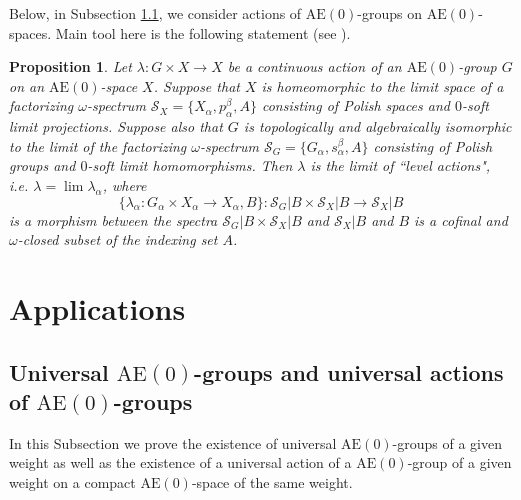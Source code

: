 \documentclass[12pt,draft]{amsart}
\theoremstyle{plain}
\newtheorem{pro}[thm]{Proposition}
\theoremstyle{definition}
\numberwithin{equation}{section}
\begin{document}
Below, in Subsection \ref{SS:universal}, we consider actions of
$\text{AE}(0)$-groups on $\text{AE}(0)$-spaces. Main tool here
is the following statement (see \cite[Theorem 8.7.1]{chibook96}).

\begin{pro}\label{P:action}
Let $\lambda \colon G \times X \to X$ be a continuous action of
an $\text{AE}(0)$-group $G$ 
on an $\text{AE}(0)$-space $X$. Suppose that $X$ is homeomorphic
to the limit space of a factorizing $\omega$-spectrum
${\mathcal S}_{X} = \{ X_{\alpha}, p_{\alpha}^{\beta}, A\}$
consisting of Polish spaces and $0$-soft limit projections.
Suppose also that $G$ is topologically and algebraically
isomorphic to the limit of the factorizing $\omega$-spectrum
${\mathcal S}_{G} = \{ G_{\alpha}, s_{\alpha}^{\beta}, A\}$
consisting of Polish groups and $0$-soft limit homomorphisms.
Then $\lambda$ is the limit of ``level actions", i.e.
$\lambda = \lim \lambda_{\alpha}$, where 
\[ \{ \lambda_{\alpha} \colon G_{\alpha} \times X_{\alpha}
\to X_{\alpha} , B\} \colon {\mathcal S}_{G}|B \times
{\mathcal S}_{X}|B \to {\mathcal S}_{X}|B\]
 \noindent is a morphism between the spectra
${\mathcal S}_{G}|B \times {\mathcal S}_{X}|B$ and
${\mathcal S}_{X}|B$ and $B$ is a cofinal and
$\omega$-closed subset of the indexing set $A$.
\end{pro}

\section{Applications}\label{S:applications}


\subsection{Universal $\text{AE}(0)$-groups and universal
actions of $\text{AE}(0)$-groups}\label{SS:universal}
In this Subsection we prove the existence of universal
$\text{AE}(0)$-groups of a given weight as well as the
existence of a universal action of a $\text{AE}(0)$-group
of a given weight on a compact $\text{AE}(0)$-space of the
same weight.
\end{document}
